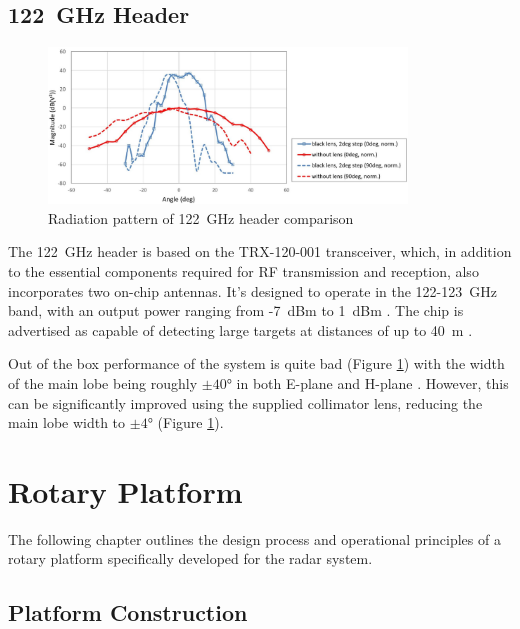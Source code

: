 \section{122~GHz Header}


\begin{figure}[h!]
  \centering
  \includegraphics[width=0.85\textwidth]{../img/sirad122rad.jpg}
	\caption[Radiation pattern of 122~GHz header comparison \cite{siradTRX122col}]{Radiation pattern of 122~GHz header comparison \cite{siradTRX122col}}
  \label{fig:sirad122rad}
\end{figure}

The 122~GHz header is based on the TRX-120-001 transceiver, which, in addition to the essential components required for RF transmission and reception, also incorporates two on-chip antennas.
It's designed to operate in the 122-123~GHz band, with an output power ranging from -7~dBm to 1~dBm \cite{siradTRX122}.
The chip is advertised as capable of detecting large targets at distances of up to 40~m \cite{siradMANOld}.

Out of the box performance of the system is quite bad (Figure \ref{fig:sirad122rad}) with the width of the main lobe being roughly $\pm40\text{°}$ in both E-plane and H-plane \cite{siradTRX122}.
However, this can be significantly improved using the supplied collimator lens, reducing the main lobe width to $\pm4\text{°}$ \cite{siradTRX122col} (Figure \ref{fig:sirad122rad}).



\chapter{Rotary Platform}

The following chapter outlines the design process and operational principles of a rotary platform specifically developed for the \sirad radar system.


\section{Platform Construction}

